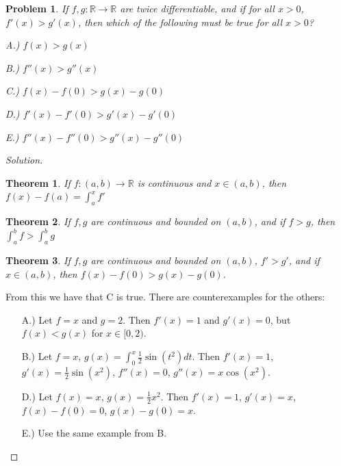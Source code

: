 \documentclass[12pt,oneside]{book}
\theoremstyle{mystyle}
\newtheorem{problem}{Problem}[section]
\newtheorem*{theorem*}{Theorem}
\begin{document}
\begin{problem}
If $f,g:\mathbb{R}\rightarrow \mathbb{R}$ are twice differentiable, and if for all $x>0$, $f'(x)>g'(x)$, then which of the following must be true for all $x>0$?
\begin{enumerate}
    \begin{multicols}{3}
    \item[A.)] $f(x)>g(x)$
    \item[B.)] $f''(x)>g''(x)$
    \item[C.)] $f(x)-f(0)>g(x)-g(0)$
    \item[D.)] $f'(x)-f'(0)>g'(x)-g'(0)$
    \item[E.)] $f''(x) - f''(0)>g''(x)-g''(0)$
    \end{multicols}
\end{enumerate}
\end{problem}
\begin{proof}[Solution]
\begin{theorem*}
If $f:(a,b)\rightarrow \mathbb{R}$ is continuous and $x\in (a,b)$, then $f(x)-f(a) = \int_{a}^{x}f'$ 
\end{theorem*}
\begin{theorem*}
If $f,g$ are continuous and bounded on $(a,b)$, and if $f>g$, then $\int_{a}^{b}f > \int_{a}^{b}g$
\end{theorem*}
\begin{theorem*}
If $f,g$ are continuous and bounded on $(a,b)$, $f'>g'$, and if $x\in (a,b)$, then $f(x) - f(0) > g(x) - g(0)$.
\end{theorem*}
From this we have that C is true. There are counterexamples for the others:

\begin{enumerate}
    \item[A.)] Let $f = x$ and $g = 2$. Then $f'(x) = 1$ and $g'(x) = 0$, but $f(x)<g(x)$ for $x\in [0,2)$.
    \item[B.)] Let $f = x$, $g(x) = \int_{0}^{x} \frac{1}{2}\sin(t^2)dt$. Then $f'(x) = 1$, $g'(x) = \frac{1}{2}\sin(x^2)$, $f''(x) = 0$, $g''(x) = x\cos(x^2)$.
    \item[D.)] Let $f(x) = x$, $g(x) = \frac{1}{2}x^2$. Then $f'(x) = 1$, $g'(x) = x$, $f(x)-f(0) = 0$, $g(x)-g(0) = x$.
    \item[E.)] Use the same example from B.
\end{enumerate}
\end{proof}
\end{document}
